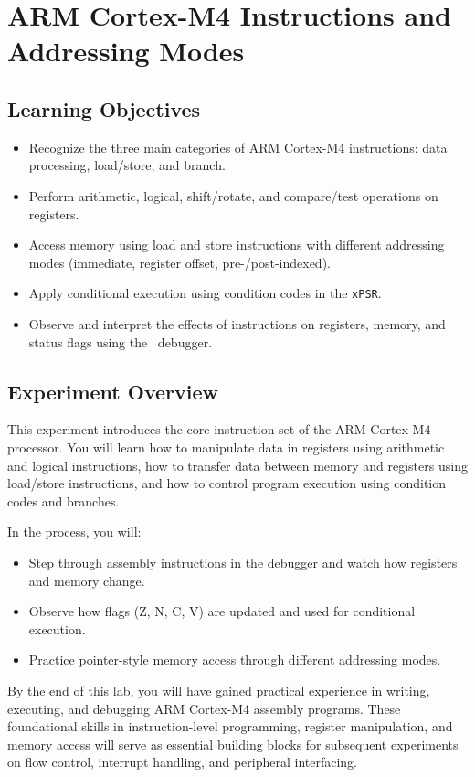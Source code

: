 \chapter{ARM Cortex-M4 Instructions and Addressing Modes}

\section*{Learning Objectives}
\begin{itemize}[nosep]
  \item Recognize the three main categories of ARM Cortex-M4 instructions: data processing, load/store, and branch.  
  \item Perform arithmetic, logical, shift/rotate, and compare/test operations on registers.  
  \item Access memory using load and store instructions with different addressing modes (immediate, register offset, pre-/post-indexed).  
  \item Apply conditional execution using condition codes in the \texttt{xPSR}.  
  \item Observe and interpret the effects of instructions on registers, memory, and status flags using the \keil\ debugger.  
\end{itemize}

\section*{Experiment Overview}
This experiment introduces the core instruction set of the ARM Cortex-M4 processor.  
You will learn how to manipulate data in registers using arithmetic and logical instructions, how to transfer data between memory and registers using load/store instructions, and how to control program execution using condition codes and branches.  

In the process, you will:  
\begin{itemize}[nosep]
  \item Step through assembly instructions in the debugger and watch how registers and memory change.  
  \item Observe how flags (Z, N, C, V) are updated and used for conditional execution.  
  \item Practice pointer-style memory access through different addressing modes.  
\end{itemize}  

By the end of this lab, you will have gained practical experience in writing, executing, and debugging ARM Cortex-M4 assembly programs. These foundational skills in instruction-level programming, register manipulation, and memory access will serve as essential building blocks for subsequent experiments on flow control, interrupt handling, and peripheral interfacing.

